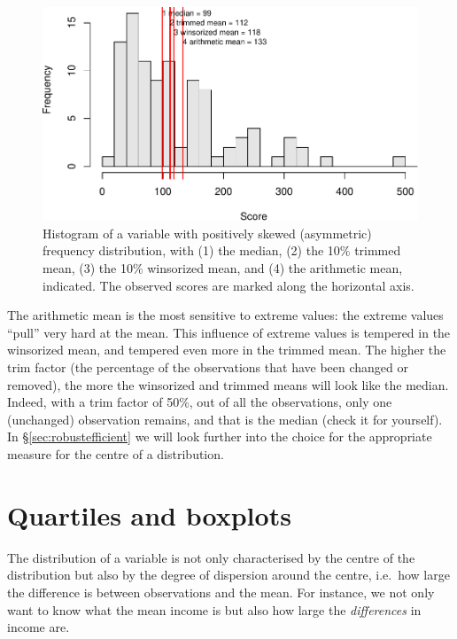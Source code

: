 \documentclass[
]{book}
\begin{document}
\begin{figure}
\centering
\includegraphics{QMS-EN_files/figure-latex/centraltendencies-1.pdf}
\caption{\label{fig:centraltendencies}Histogram of a variable with positively skewed (asymmetric) frequency distribution, with (1) the median, (2) the 10\% trimmed mean, (3) the 10\% winsorized mean, and (4) the arithmetic mean, indicated. The observed scores are marked along the horizontal axis.}
\end{figure}

The arithmetic mean is the most sensitive to extreme values:
the extreme values ``pull'' very hard at the mean. This influence
of extreme values is tempered in the winsorized mean, and
tempered even more in the trimmed mean. The higher the
trim factor (the percentage of the observations that have been changed or
removed), the more the winsorized and trimmed means will look like the median.
Indeed, with a trim factor of 50\%, out of all
the observations, only one (unchanged) observation remains, and that
is the median (check it for yourself). In
§\ref{sec:robustefficient} we will look further into the choice
for the appropriate measure for the centre of a distribution.

\hypertarget{sec:quartiles-and-boxplots}{%
\section{Quartiles and boxplots}\label{sec:quartiles-and-boxplots}}

The distribution of a variable is not only characterised by the
centre of the distribution but also by the degree of dispersion around
the centre, i.e.~how large the difference is between observations and the mean.
For instance, we not only want to know
what the mean income is but also how large the \emph{differences} in
income are.
\end{document}
